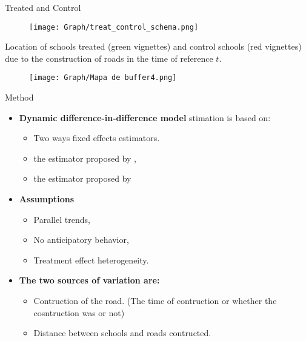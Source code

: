 \documentclass[9pt]{beamer}
\begin{document}
\begin{frame}{Treated and Control}
    \label{concession}
\begin{figure}[H]
    \centering
    \renewcommand\thefigure{4.2}
     \texttt{[image: Graph/treat\_control\_schema.png]}\\      
\end{figure}
    \footnotesize {Location of schools treated (green vignettes) and control schools (red vignettes) due to the construction of roads in the time of reference $t$.    }
\begin{figure}[H]
    \centering
    \texttt{[image: Graph/Mapa de buffer4.png]}  
\end{figure}

\end{frame}



\begin{frame}{Method}

\begin{itemize}
   
\item \textbf{Dynamic difference-in-difference model} stimation is based on:
    \begin{itemize}
        \item Two ways fixed effects estimators.
        \item the estimator proposed by    \cite{CALLAWAY2021200}, 
        \item the estimator proposed by   \cite{SUN2021175}
    \end{itemize}

\item \textbf{Assumptions  \cite{SUN2021175}}
      \begin{itemize}
            \item Parallel trends,
            \item No anticipatory behavior, 
            \item Treatment effect heterogeneity.  
    \end{itemize}

\item \textbf{ The two sources of variation are:}        
        
    \begin{itemize}
        \item Contruction of the road. (The time of contruction or whether the cosntruction was or not)
        
        \item  Distance between schools and roads contructed. 
    \end{itemize}

\end{itemize}

\end{frame}
\end{document}
